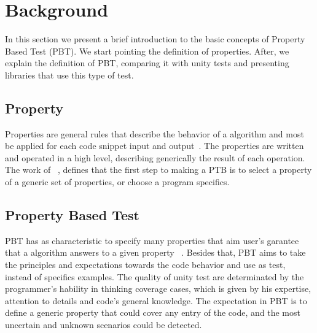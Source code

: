 \section{Background} \label{sec:back}

	In this section we present a brief introduction to the basic concepts of Property Based Test (PBT). We start pointing the definition of properties. After, we explain the definition of PBT, comparing it with unity tests and presenting libraries that use this type of test.
	  
	\subsection{Property}
	
	Properties are general rules that describe the behavior of a algorithm and most be applied for each code snippet input and output~\cite{9781680506211}. The properties are written and operated in a high level, describing generically the result of each operation.
	The work of ~\cite{fink1997property}, defines that the first step to making a PTB is to select a property of a generic set of properties, or choose a program specifics.
	 
	\subsection{Property Based Test}

	PBT has as characteristic to specify many properties that aim user's garantee that a algorithm answers to a given property ~\cite{fink1997property}. Besides that, PBT aims to take the principles and expectations towards the code behavior and use as test, instead of specifics examples. The quality of unity test are determinated by the programmer's hability in thinking coverage cases, which is given by his expertise, attention to details and code's general knowledge. The expectation in PBT is to define a generic property that could cover any entry of the code, and the most uncertain and unknown scenarios could be detected.

